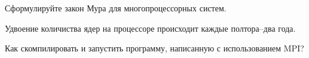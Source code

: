 \documentclass[a4paper, 12pt, addpoints]{exam}
\begin{document}
\begin{questions}
\question[3] Сформулируйте закон Мура для многопроцессорных систем.
\begin{solution}[2cm]
Удвоение количиства ядер на процессоре происходит каждые
полтора–два года.
\end{solution}

\question[3] Как скомпилировать и запустить программу, написанную с использованием MPI?
\begin{solution}[2cm]
\end{solution}


\end{questions}
\end{document}

